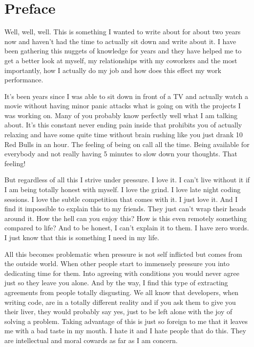 \chapter*{Preface}

Well, well, well. This is something I wanted to write about for about two years now and haven’t had the time to actually sit down and write about it. I have been gathering this nuggets of knowledge for years and they have helped me to get a better look at myself, my relationships with my coworkers and the most importantly, how I actually do my job and how does this effect my work performance.

It’s been years since I was able to sit down in front of a TV and actually watch a movie without having minor panic attacks what is going on with the projects I was working on. Many of you probably know perfectly well what I am talking about. It’s this constant never ending pain inside that prohibits you of actually relaxing and have some quite time without brain rushing like you just drank 10 Red Bulls in an hour. The feeling of being on call all the time. Being available for everybody and not really having 5 minutes to slow down your thoughts. That feeling!

But regardless of all this I strive under pressure. I love it. I can’t live without it if I am being totally honest with myself. I love the grind. I love late night coding sessions. I love the subtle competition that comes with it. I just love it. And I find it impossible to explain this to my friends. They just can’t wrap their heads around it. How the hell can you enjoy this? How is this even remotely something compared to life? And to be honest, I can’t explain it to them. I have zero words. I just know that this is something I need in my life.

All this becomes problematic when pressure is not self inflicted but comes from the outside world. When other people start to immensely pressure you into dedicating time for them. Into agreeing with conditions you would never agree just so they leave you alone. And by the way, I find this type of extracting agreements from people totally disgusting. We all know that developers, when writing code, are in a totally different reality and if you ask them to give you their liver, they would probably say yes, just to be left alone with the joy of solving a problem. Taking advantage of this is just so foreign to me that it leaves me with a bad taste in my mouth. I hate it and I hate people that do this. They are intellectual and moral cowards as far as I am concern.

